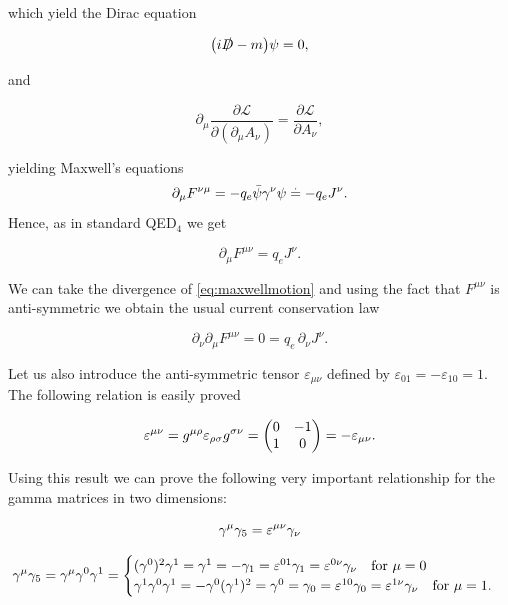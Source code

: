 which yield the Dirac equation 

\begin{equation}
    \qty(i \slashed{D} - m )\psi = 0,
\end{equation}

 and
 
\begin{equation}
    \partial_\mu \frac{\partial \mathscr{L}}{\partial(\partial_\mu A_\nu)} = \frac{\partial\mathscr{L}}{\partial A_\nu},
\end{equation}

yielding Maxwell's equations $$\partial_\mu F^{\nu\mu} =-q_e \bar\psi\gamma^\nu\psi \overset{.}{=}-q_e J^\nu.$$ Hence, as in standard QED$_4$ we get

\begin{equation}
    \partial_\mu F^{\mu\nu} = q_e J^\nu.
    \label{eq:maxwellmotion}
\end{equation}

We can take the divergence of \eqref{eq:maxwellmotion} and using the fact that $F^{\mu\nu}$ is anti-symmetric we obtain the usual current conservation law

\begin{equation}
\partial_\nu\partial_\mu F^{\mu\nu} = 0 =q_e\, \partial_\nu J^\nu. 
\label{eq:currentcons}
\end{equation}

Let us also introduce the anti-symmetric tensor $\varepsilon_{\mu\nu}$ defined by $\varepsilon_{01} = -\varepsilon_{10} = 1$. The following relation is easily proved

\begin{equation*}
	\varepsilon^{\mu\nu} = g^{\mu \rho}\varepsilon_{\rho\sigma}g^{\sigma \nu} = \mqty(\admat[0]{-1,1})=-\varepsilon_{\mu\nu}.
\end{equation*}

Using this result we can prove the following very important relationship for the gamma matrices in two dimensions:

\begin{equation}
\gamma^\mu\gamma_5 = \varepsilon^{\mu\nu}\gamma_\nu
\label{eq:gammarel}
\end{equation}

\begin{equation*}
	\gamma^\mu\gamma_5 = \gamma^\mu\gamma^0\gamma^1 = 
	\begin{cases}
		(\gamma^0)^2\gamma^1 = \gamma^1 = -\gamma_1 = \varepsilon^{01}\gamma_1 = \varepsilon^{0\nu}\gamma_\nu\quad \text{for }\mu=0\\
		\gamma^1\gamma^0\gamma^1=-\gamma^0(\gamma^1)^2 = \gamma^0 = \gamma_0 = \varepsilon^{10}\gamma_0 = \varepsilon^{1\nu}\gamma_\nu\quad \text{for }\mu=1.
	\end{cases}
\end{equation*}

